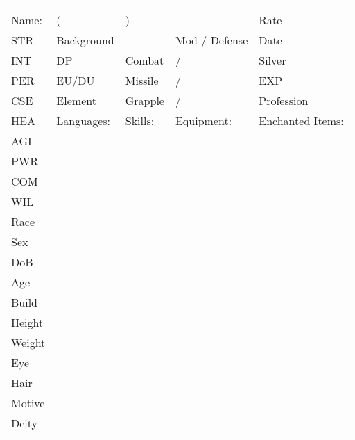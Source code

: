 \begin{tabularx}{\textwidth}{ X l l l l }
\midrule\\
Name: & ( & ) & & Rate\\
STR & Background & & Mod / Defense & Date\\
INT & DP & Combat & / & Silver\\
PER & EU/DU & Missile & / & EXP\\
CSE & Element & Grapple & / & Profession\\
HEA & Languages: & Skills: & Equipment: & Enchanted Items:\\
AGI\\
PWR\\
COM\\
WIL\\[0.25cm]

Race\\
Sex\\
DoB\\
Age\\
Build\\
Height\\
Weight\\
Eye\\
Hair\\
Motive\\
Deity\\
\midrule
\end{tabularx}